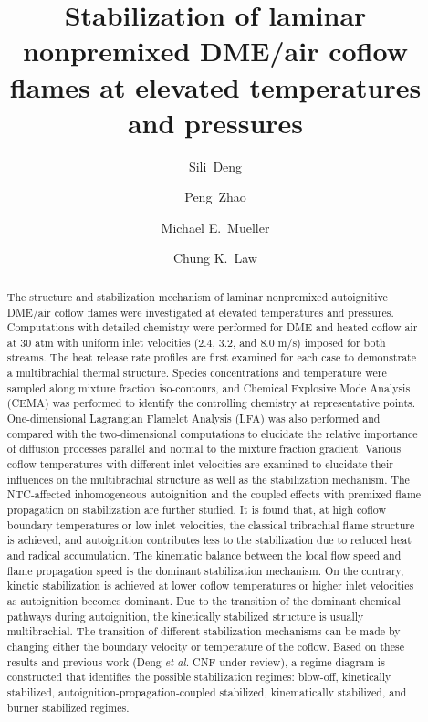 \documentclass[review,3p,times]{elsarticle}
\begin{document}
\begin{frontmatter}

\title{Stabilization of laminar nonpremixed DME/air coflow flames at elevated temperatures and pressures}

\author{Sili~Deng}
\author{Peng~Zhao}
\author{Michael E.~Mueller}
\author{Chung K.~Law}

\address{Department of Mechanical and Aerospace Engineering, Princeton University, Princeton, NJ 08544, USA}

\begin{abstract}

The structure and stabilization mechanism of laminar nonpremixed autoignitive DME/air coflow flames were investigated at elevated temperatures and pressures. Computations with detailed chemistry were performed for DME and heated coflow air at $30$ atm with uniform inlet velocities ($2.4$, $3.2$, and $8.0$ m/s) imposed for both streams.  The heat release rate profiles are first examined for each case to demonstrate a multibrachial thermal structure.  Species concentrations and temperature were sampled along mixture fraction iso-contours, and Chemical Explosive Mode Analysis (CEMA) was performed to identify the controlling chemistry at representative points.  One-dimensional Lagrangian Flamelet Analysis (LFA) was also performed and compared with the two-dimensional computations to elucidate the relative importance of diffusion processes parallel and normal to the mixture fraction gradient.  Various coflow temperatures with different inlet velocities are examined to elucidate their influences on the multibrachial structure as well as the stabilization mechanism.  The NTC-affected inhomogeneous autoignition and the coupled effects with premixed flame propagation on stabilization are further studied.  It is found that, at high coflow boundary temperatures or low inlet velocities, the classical tribrachial flame structure is achieved, and autoignition contributes less to the stabilization due to reduced heat and radical accumulation.  The kinematic balance between the local flow speed and flame propagation speed is the dominant stabilization mechanism.  On the contrary, kinetic stabilization is achieved at lower coflow temperatures or higher inlet velocities as autoignition becomes dominant.  Due to the transition of the dominant chemical pathways during autoignition, the kinetically stabilized structure is usually multibrachial.  The transition of different stabilization mechanisms can be made by changing either the boundary velocity or temperature of the coflow.  Based on these results and previous work (Deng \emph{et al.} CNF under review), a regime diagram is constructed that identifies the possible stabilization regimes: blow-off, kinetically stabilized, autoignition-propagation-coupled stabilized, kinematically stabilized, and burner stabilized regimes.          


\end{abstract}
\end{frontmatter}
\end{document}
